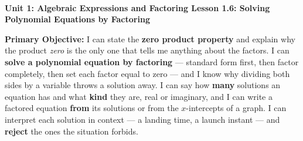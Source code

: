 \documentclass[10pt]{article}
\newcommand{\UnitNumberName}{Unit 1: Algebraic Expressions and Factoring \quad}
\newcommand{\LessonNumberName}{Lesson 1.6: Solving Polynomial Equations by Factoring}
\begin{document}
\begin{center}
    {\Large\bfseries \CourseName \\
    {\small\bfseries \UnitNumberName \LessonNumberName}}
\end{center}

\begin{tcolorbox}[colback=mist, colframe=royal, boxrule=0.9pt, arc=2mm,
    left=2mm, right=2mm, top=1.5mm, bottom=1.5mm]
    \textbf{Primary Objective:} I can state the \textbf{zero product property} and explain why the
    product \emph{zero} is the only one that tells me anything about the factors. I can
    \textbf{solve a polynomial equation by factoring} --- standard form first, then factor
    completely, then set each factor equal to zero --- and I know why dividing both sides by a
    variable throws a solution away. I can say how \textbf{many} solutions an equation has and what
    \textbf{kind} they are, real or imaginary, and I can write a factored equation \textbf{from} its
    solutions or from the $x$-intercepts of a graph. I can interpret each solution in context --- a
    landing time, a launch instant --- and \textbf{reject} the ones the situation forbids.
\end{tcolorbox}
\end{document}
